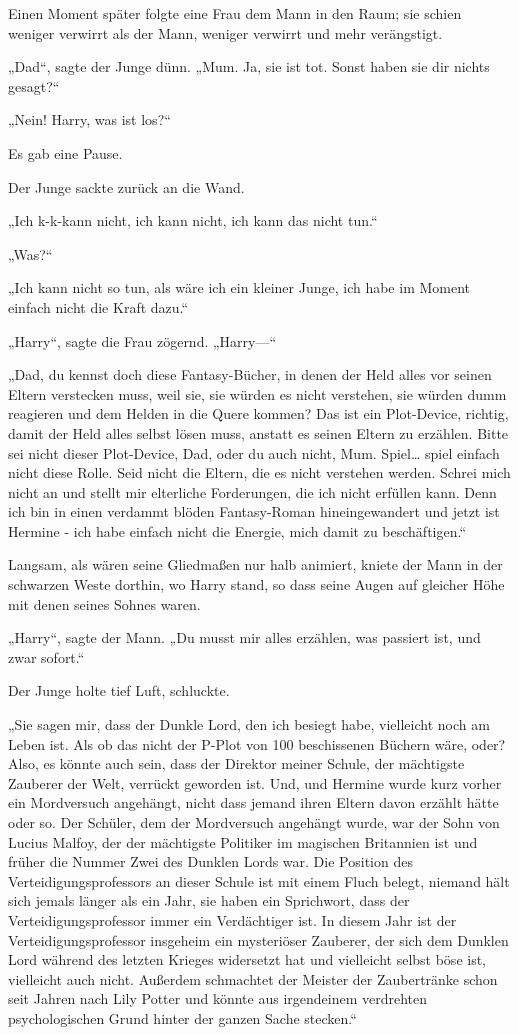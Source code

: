 {Einen Moment später folgte eine Frau dem Mann in den Raum; sie schien weniger verwirrt als der Mann, weniger verwirrt und mehr verängstigt.

„Dad“, sagte der Junge dünn. „Mum. Ja, sie ist tot. Sonst haben sie dir nichts gesagt?“

„Nein! Harry, was ist los?“

Es gab eine Pause.

Der Junge sackte zurück an die Wand.

„Ich k-k-kann nicht, ich kann nicht, ich kann das nicht tun.“

„Was?“

„Ich kann nicht so tun, als wäre ich ein kleiner Junge, ich habe im Moment einfach nicht die Kraft dazu.“

„Harry“, sagte die Frau zögernd. „Harry—“

„Dad, du kennst doch diese Fantasy-Bücher, in denen der Held alles vor seinen Eltern verstecken muss, weil sie, sie würden es nicht verstehen, sie würden dumm reagieren und dem Helden in die Quere kommen? Das ist ein Plot-Device, richtig, damit der Held alles selbst lösen muss, anstatt es seinen Eltern zu erzählen. Bitte sei nicht dieser Plot-Device, Dad, oder du auch nicht, Mum. Spiel… spiel einfach nicht diese Rolle. Seid nicht die Eltern, die es nicht verstehen werden. Schrei mich nicht an und stellt mir elterliche Forderungen, die ich nicht erfüllen kann. Denn ich bin in einen verdammt blöden Fantasy-Roman hineingewandert und jetzt ist Hermine - ich habe einfach nicht die Energie, mich damit zu beschäftigen.“

Langsam, als wären seine Gliedmaßen nur halb animiert, kniete der Mann in der schwarzen Weste dorthin, wo Harry stand, so dass seine Augen auf gleicher Höhe mit denen seines Sohnes waren.

„Harry“, sagte der Mann. „Du musst mir alles erzählen, was passiert ist, und zwar sofort.“

Der Junge holte tief Luft, schluckte.

„Sie sagen mir, dass der Dunkle Lord, den ich besiegt habe, vielleicht noch am Leben ist. Als ob das nicht der P-Plot von 100 beschissenen Büchern wäre, oder? Also, es könnte auch sein, dass der Direktor meiner Schule, der mächtigste Zauberer der Welt, verrückt geworden ist. Und, und Hermine wurde kurz vorher ein Mordversuch angehängt, nicht dass jemand ihren Eltern davon erzählt hätte oder so. Der Schüler, dem der Mordversuch angehängt wurde, war der Sohn von Lucius Malfoy, der der mächtigste Politiker im magischen Britannien ist und früher die Nummer Zwei des Dunklen Lords war. Die Position des Verteidigungsprofessors an dieser Schule ist mit einem Fluch belegt, niemand hält sich jemals länger als ein Jahr, sie haben ein Sprichwort, dass der Verteidigungsprofessor immer ein Verdächtiger ist. In diesem Jahr ist der Verteidigungsprofessor insgeheim ein mysteriöser Zauberer, der sich dem Dunklen Lord während des letzten Krieges widersetzt hat und vielleicht selbst böse ist, vielleicht auch nicht. Außerdem schmachtet der Meister der Zaubertränke schon seit Jahren nach Lily Potter und könnte aus irgendeinem verdrehten psychologischen Grund hinter der ganzen Sache stecken.“

}
